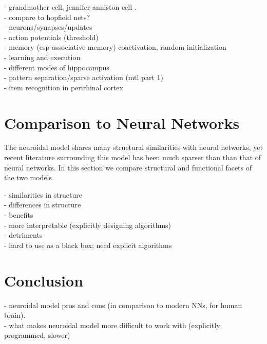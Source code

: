 \documentclass[letterpaper, 12pt]{article}
\begin{document}
- grandmother cell,  jennifer anniston cell \cite{quiroga_invariant_2005}.\\
- compare to hopfield nets?\\
- neurons/synapses/updates\\
- action potentials (threshold)\\
- memory (esp associative memory) coactivation, random initialization\\
- learning and execution\\
	- different modes of hippocampus\\

- pattern separation/sparse activation (mtl part 1)\\
- item recognition in perirhinal cortex %

\section{Comparison to Neural Networks}
The neuroidal model shares many structural similarities with neural networks, yet recent literature surrounding this model has been much sparser than than that of neural networks. In this section we compare structural and functional facets of the two models.

- similarities in structure\\
- differences in structure\\
- benefits\\
	- more interpretable (explicitly designing algorithms)\\
- detriments\\
	- hard to use as a black box; need explicit algorithms\\

\section{Conclusion}
- neuroidal model pros and cons (in comparison to modern NNs, for human brain).\\
- what makes neuroidal model more difficult to work with (explicitly programmed, slower)\\



\end{document}
